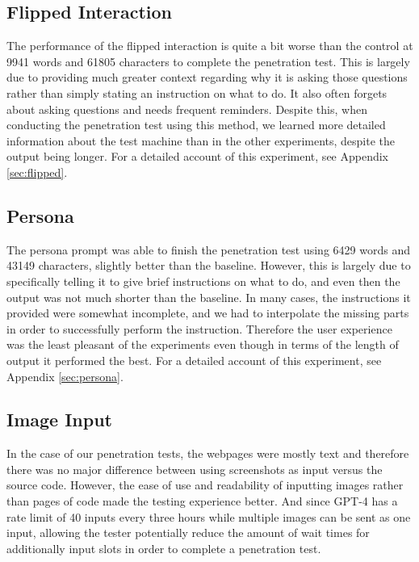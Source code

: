 \documentclass[conference]{IEEEtran}
\begin{document}
\subsection{Flipped Interaction}
The performance of the flipped interaction is quite a bit worse than the control at 9941 words and 61805 characters to complete the penetration test. This is largely due to providing much greater context regarding why it is asking those questions rather than simply stating an instruction on what to do. It also often forgets about asking questions and needs frequent reminders. Despite this, when conducting the penetration test using this method, we learned more detailed information about the test machine than in the other experiments, despite the output being longer. For a detailed account of this experiment, see Appendix \ref{sec:flipped}.

\subsection{Persona}
The persona prompt was able to finish the penetration test using 6429 words and 43149 characters, slightly better than the baseline. However, this is largely due to specifically telling it to give brief instructions on what to do, and even then the output was not much shorter than the baseline. In many cases, the instructions it provided were somewhat incomplete, and we had to interpolate the missing parts in order to successfully perform the instruction. Therefore the user experience was the least pleasant of the experiments even though in terms of the length of output it performed the best. For a detailed account of this experiment, see Appendix \ref{sec:persona}.

\subsection{Image Input}
In the case of our penetration tests, the webpages were mostly text and therefore there was no major difference between using screenshots as input versus the source code. However, the ease of use and readability of inputting images rather than pages of code made the testing experience better. And since GPT-4 has a rate limit of 40 inputs every three hours while multiple images can be sent as one input, allowing the tester potentially reduce the amount of wait times for additionally input slots in order to complete a penetration test.
\end{document}
